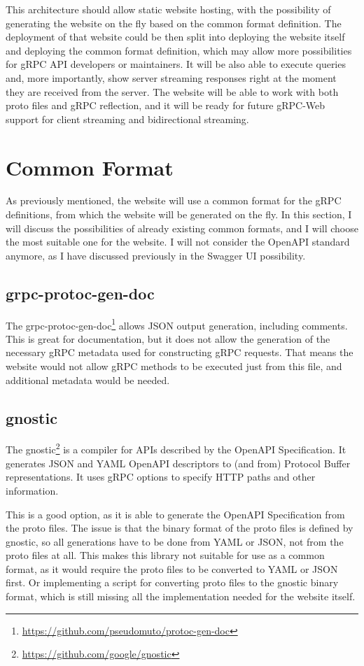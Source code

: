 This architecture should allow static website hosting, with the possibility of generating the website on the fly based on the common format definition.
The deployment of that website could be then split into deploying the website itself and deploying the common format definition, which may allow more possibilities for gRPC API developers or maintainers.
It will be also able to execute queries and, more importantly, show server streaming responses right at the moment they are received from the server.
The website will be able to work with both proto files and gRPC reflection, and it will be ready for future gRPC-Web support for client streaming and bidirectional streaming.


\section{Common Format}
As previously mentioned, the website will use a common format for the gRPC definitions, from which the website will be generated on the fly.
In this section, I will discuss the possibilities of already existing common formats, and I will choose the most suitable one for the website.
I will not consider the OpenAPI standard anymore, as I have discussed previously in the Swagger UI possibility.

\subsection{grpc-protoc-gen-doc}
The grpc-protoc-gen-doc\footnote{\url{https://github.com/pseudomuto/protoc-gen-doc}} allows JSON output generation, including comments.
This is great for documentation, but it does not allow the generation of the necessary gRPC metadata used for constructing gRPC requests.
That means the website would not allow gRPC methods to be executed just from this file, and additional metadata would be needed.

\subsection{gnostic}
The gnostic\footnote{\url{https://github.com/google/gnostic}} is a compiler for APIs described by the OpenAPI Specification.
It generates JSON and YAML OpenAPI descriptors to (and from) Protocol Buffer representations.
It uses gRPC options to specify HTTP paths and other information.
\cite{gnostic}

This is a good option, as it is able to generate the OpenAPI Specification from the proto files.
The issue is that the binary format of the proto files is defined by gnostic, so all generations have to be done from YAML or JSON, not from the proto files at all.
This makes this library not suitable for use as a common format, as it would require the proto files to be converted to YAML or JSON first.
Or implementing a script for converting proto files to the gnostic binary format, which is still missing all the implementation needed for the website itself.

